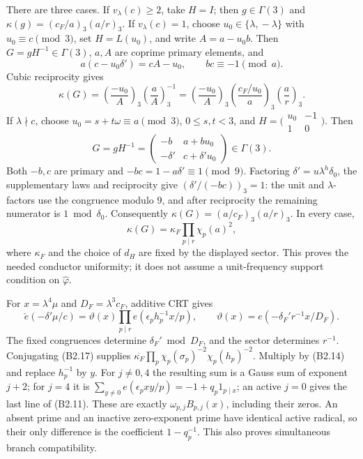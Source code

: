 \documentclass[11pt,a4paper]{article}
\begin{document}
There are three cases. If \(v_\lambda(c)\ge2\), take \(H=I\); then
\(g\in\Gamma(3)\) and \(\kappa(g)=(c_F/a)_3(a/r)_3\). If
\(v_\lambda(c)=1\), choose \(u_0\in\{\lambda,\allowbreak{}-\lambda\}\) with
\(u_0\equiv c\pmod3\), set \(H=L(u_0)\), and write \(A=a-u_0b\). Then
\(G=gH^{-1}\in\Gamma(3)\), \(a,\allowbreak{}A\) are coprime primary elements, and \[
a(c-u_0\delta')=cA-u_0,\qquad bc\equiv-1\pmod a.
\] Cubic reciprocity gives \[
\kappa(G)=
\left(\frac{-u_0}{A}\right)_3\left(\frac aA\right)_3^{-1}
=\left(\frac{-u_0}{A}\right)_3
 \left(\frac{c_F/u_0}{a}\right)_3\left(\frac ar\right)_3.
\] If \(\lambda\nmid c\), choose \(u_0=s+t\omega\equiv a\pmod3\),
\(0\le s,\allowbreak{}t<3\), and
\(H=\bigl(\begin{smallmatrix}u_0&-1\\1&0\end{smallmatrix}\bigr)\). Then
\[
G=gH^{-1}=
\begin{pmatrix}-b&a+bu_0\\-\delta'&c+\delta'u_0\end{pmatrix}\in\Gamma(3).
\] Both \(-b,\allowbreak{}c\) are primary and \(-bc=1-a\delta'\equiv1\pmod9\).
Factoring \(\delta'=u\lambda^h\delta_0\), the supplementary laws and
reciprocity give \((\delta'/(-bc))_3=1\): the unit and
\(\lambda\)-factors use the congruence modulo \(9\), and after
reciprocity the remaining numerator is \(1\bmod\delta_0\). Consequently
\(\kappa(G)=(a/c_F)_3(a/r)_3\). In every case, \[
\kappa(G)=\kappa_F\prod_{p\mid r}\chi_p(a)^2,
\tag{B2.17}
\] where \(\kappa_F\) and the choice of \(d_H\) are fixed by the
displayed sector. This proves the needed conductor uniformity; it does
not assume a unit-frequency support condition on \(\widehat\varphi\).

For \(x=\lambda^4\mu\) and \(D_F=\lambda^3c_F\), additive CRT gives \[
\check e(-\delta'\mu/c)
=\vartheta(x)\prod_{p\mid r}e(\epsilon_ph_p^{-1}x/p),\qquad
\vartheta(x)=e(-\delta_F'r^{-1}x/D_F).
\tag{B2.18}
\] The fixed congruences determine \(\delta_F'\bmod D_F\), and the
sector determines \(r^{-1}\). Conjugating (B2.17) supplies
\(\overline{\kappa_F}\prod_p\chi_p(\sigma_p)^{-2}\chi_p(h_p)^{-2}\).
Multiply by (B2.14) and replace \(h_p^{-1}\) by \(y\). For \(j\ne0,\allowbreak{}4\)
the resulting sum is a Gauss sum of exponent \(j+2\); for \(j=4\) it is
\(\sum_{y\ne0}e(\epsilon_pxy/p)=-1+q_p1_{p\mid x}\); an active \(j=0\)
gives the last line of (B2.11). These are exactly
\(\omega_{p,\allowbreak{}j}B_{p,\allowbreak{}j}(x)\), including their zeros. An absent prime and
an inactive zero-exponent prime have identical active radical, so their
only difference is the coefficient \(1-q_p^{-1}\). This also proves
simultaneous branch compatibility.
\end{document}
